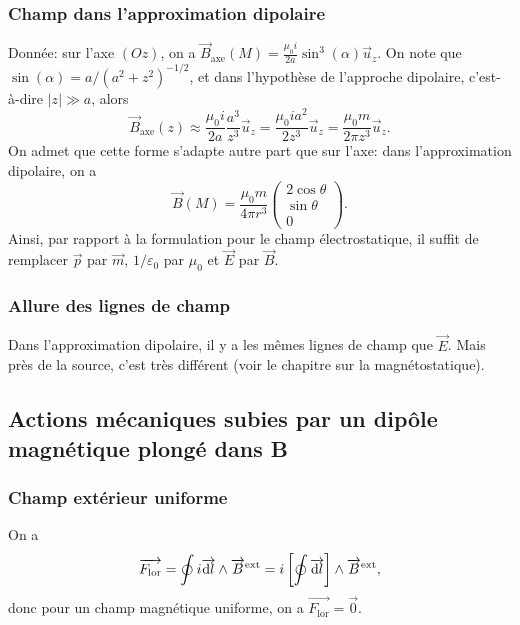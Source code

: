 \subsubsection{Champ dans l'approximation dipolaire}

Donnée: sur l'axe $(Oz)$, on a $\vec{B}_{\mathrm{axe}}(M)=\frac{\mu_0i}{2a}\sin^{3}(\alpha)\vec{u}_z$. On note que $\sin(\alpha)=a/(a^{2}+z^{2})^{-1/2}$, et dans l'hypothèse de l'approche dipolaire, c'est-à-dire $\left\lvert z\right\rvert\gg a$, alors
\begin{equation}
    \vec{B}_{\mathrm{axe}}(z)\approx\frac{\mu_0i}{2a}\frac{a^{3}}{z^{3}}\vec{u}_z=\frac{\mu_0ia^{2}}{2z^{3}}\vec{u}_z=\frac{\mu_0 m}{2\pi z^{3}}\vec{u}_z.
\end{equation}
On admet que cette forme s'adapte autre part que sur l'axe: dans l'approximation dipolaire, on a 
\begin{equation}
    \boxed{
    \vec{B}(M)=\frac{\mu_0 m}{4\pi r^{3}}\begin{pmatrix}
        2\cos\theta\\\sin\theta\\0
    \end{pmatrix}
    .}
\end{equation}
Ainsi, par rapport à la formulation pour le champ électrostatique, il suffit de remplacer $\vec{p}$ par $\vec{m}$, $1/\varepsilon_0$ par $\mu_0$ et $\vec{E}$ par $\vec{B}$.

\subsubsection{Allure des lignes de champ}
Dans l'approximation dipolaire, il y a les mêmes lignes de champ que $\vec{E}$. Mais près de la source, c'est très différent (voir le chapitre sur la magnétostatique).

\subsection[Actions mécaniques subies]{Actions mécaniques subies par un dipôle magnétique plongé dans B}
\subsubsection{Champ extérieur uniforme}
On a
\begin{equation}
    \protect\overrightarrow{{F_{\mathrm{lor}}}}=\oint i\protect\overrightarrow{{\mathrm{d} l}}\wedge\protect\overrightarrow{{B}}^{\mathrm{ext}}=i\left[\oint\protect\overrightarrow{{\mathrm{d} l}}\right]\wedge\protect\overrightarrow{{B}}^{\mathrm{ext}},
\end{equation}
donc pour un champ magnétique uniforme, on a $\vec{F_{\mathrm{lor}}}=\vec{0}$.

